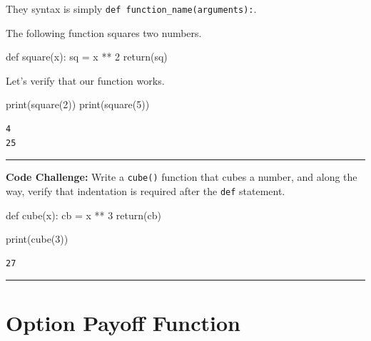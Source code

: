 \documentclass[
  letterpaper,
  DIV=11,
  numbers=noendperiod]{scrreprt}
\newenvironment{Shaded}{\begin{snugshade}}{\end{snugshade}}
\newcommand{\BuiltInTok}[1]{\textcolor[rgb]{0.00,0.23,0.31}{#1}}
\newcommand{\ControlFlowTok}[1]{\textcolor[rgb]{0.00,0.23,0.31}{#1}}
\newcommand{\DecValTok}[1]{\textcolor[rgb]{0.68,0.00,0.00}{#1}}
\newcommand{\KeywordTok}[1]{\textcolor[rgb]{0.00,0.23,0.31}{#1}}
\newcommand{\NormalTok}[1]{\textcolor[rgb]{0.00,0.23,0.31}{#1}}
\newcommand{\OperatorTok}[1]{\textcolor[rgb]{0.37,0.37,0.37}{#1}}
\begin{document}
They syntax is simply \texttt{def\ function\_name(arguments):}.

The following function squares two numbers.

\begin{Shaded}
\begin{Highlighting}[]
\KeywordTok{def}\NormalTok{ square(x):}
\NormalTok{    sq }\OperatorTok{=}\NormalTok{ x }\OperatorTok{**} \DecValTok{2}
    \ControlFlowTok{return}\NormalTok{(sq)}
\end{Highlighting}
\end{Shaded}

Let's verify that our function works.

\begin{Shaded}
\begin{Highlighting}[]
\BuiltInTok{print}\NormalTok{(square(}\DecValTok{2}\NormalTok{))}
\BuiltInTok{print}\NormalTok{(square(}\DecValTok{5}\NormalTok{))}
\end{Highlighting}
\end{Shaded}

\begin{verbatim}
4
25
\end{verbatim}

\begin{center}\rule{0.5\linewidth}{0.5pt}\end{center}

\textbf{Code Challenge:} Write a \texttt{cube()} function that cubes a
number, and along the way, verify that indentation is required after the
\texttt{def} statement.

\begin{Shaded}
\begin{Highlighting}[]
\KeywordTok{def}\NormalTok{ cube(x):}
\NormalTok{    cb }\OperatorTok{=}\NormalTok{ x }\OperatorTok{**} \DecValTok{3}
    \ControlFlowTok{return}\NormalTok{(cb)}

\BuiltInTok{print}\NormalTok{(cube(}\DecValTok{3}\NormalTok{))}
\end{Highlighting}
\end{Shaded}

\begin{verbatim}
27
\end{verbatim}

\begin{center}\rule{0.5\linewidth}{0.5pt}\end{center}

\hypertarget{option-payoff-function}{%
\section{Option Payoff Function}\label{option-payoff-function}}
\end{document}

